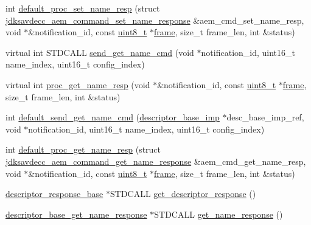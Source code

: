 \begin{DoxyCompactItemize}
\item 
int \hyperlink{classavdecc__lib_1_1descriptor__base__imp_a2f52c3b9a7ad6f490bed0c96a9136bc3}{default\+\_\+proc\+\_\+set\+\_\+name\+\_\+resp} (struct \hyperlink{structjdksavdecc__aem__command__set__name__response}{jdksavdecc\+\_\+aem\+\_\+command\+\_\+set\+\_\+name\+\_\+response} \&aem\+\_\+cmd\+\_\+set\+\_\+name\+\_\+resp, void $\ast$\&notification\+\_\+id, const \hyperlink{stdint_8h_aba7bc1797add20fe3efdf37ced1182c5}{uint8\+\_\+t} $\ast$\hyperlink{gst__avb__playbin_8c_ac8e710e0b5e994c0545d75d69868c6f0}{frame}, size\+\_\+t frame\+\_\+len, int \&status)
\item 
virtual int S\+T\+D\+C\+A\+LL \hyperlink{classavdecc__lib_1_1descriptor__base__imp_a4e8ce103baabbd5fc07deabfb95f791a}{send\+\_\+get\+\_\+name\+\_\+cmd} (void $\ast$notification\+\_\+id, uint16\+\_\+t name\+\_\+index, uint16\+\_\+t config\+\_\+index)
\item 
virtual int \hyperlink{classavdecc__lib_1_1descriptor__base__imp_ac4e290a88039a8e4915f7b9f8738881f}{proc\+\_\+get\+\_\+name\+\_\+resp} (void $\ast$\&notification\+\_\+id, const \hyperlink{stdint_8h_aba7bc1797add20fe3efdf37ced1182c5}{uint8\+\_\+t} $\ast$\hyperlink{gst__avb__playbin_8c_ac8e710e0b5e994c0545d75d69868c6f0}{frame}, size\+\_\+t frame\+\_\+len, int \&status)
\item 
int \hyperlink{classavdecc__lib_1_1descriptor__base__imp_a92f2c88d261418872a496a8145800751}{default\+\_\+send\+\_\+get\+\_\+name\+\_\+cmd} (\hyperlink{classavdecc__lib_1_1descriptor__base__imp}{descriptor\+\_\+base\+\_\+imp} $\ast$desc\+\_\+base\+\_\+imp\+\_\+ref, void $\ast$notification\+\_\+id, uint16\+\_\+t name\+\_\+index, uint16\+\_\+t config\+\_\+index)
\item 
int \hyperlink{classavdecc__lib_1_1descriptor__base__imp_acc8b1c1591bd54bc9a2d21d4f0db2e86}{default\+\_\+proc\+\_\+get\+\_\+name\+\_\+resp} (struct \hyperlink{structjdksavdecc__aem__command__get__name__response}{jdksavdecc\+\_\+aem\+\_\+command\+\_\+get\+\_\+name\+\_\+response} \&aem\+\_\+cmd\+\_\+get\+\_\+name\+\_\+resp, void $\ast$\&notification\+\_\+id, const \hyperlink{stdint_8h_aba7bc1797add20fe3efdf37ced1182c5}{uint8\+\_\+t} $\ast$\hyperlink{gst__avb__playbin_8c_ac8e710e0b5e994c0545d75d69868c6f0}{frame}, size\+\_\+t frame\+\_\+len, int \&status)
\item 
\hyperlink{classavdecc__lib_1_1descriptor__response__base}{descriptor\+\_\+response\+\_\+base} $\ast$S\+T\+D\+C\+A\+LL \hyperlink{classavdecc__lib_1_1descriptor__base__imp_a8c64c9df60afbc144cf24eab5a42c009}{get\+\_\+descriptor\+\_\+response} ()
\item 
\hyperlink{classavdecc__lib_1_1descriptor__base__get__name__response}{descriptor\+\_\+base\+\_\+get\+\_\+name\+\_\+response} $\ast$S\+T\+D\+C\+A\+LL \hyperlink{classavdecc__lib_1_1descriptor__base__imp_abf130a286ee3ca9d1f41a7e2abbd0d33}{get\+\_\+name\+\_\+response} ()
\end{DoxyCompactItemize}
